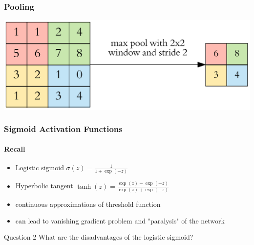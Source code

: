 \documentclass[fullscreen=true, bookmarks=true, hyperref={pdfencoding=unicode}]{beamer}
\begin{document}
\begin{frame}
  \frametitle{Pooling}
  \begin{center}
    \includegraphics[keepaspectratio,
                     width=0.8\paperwidth]{max_pooling.png}
  \end{center}


\end{frame}


\begin{frame}
\frametitle{Sigmoid Activation Functions}
  \framesubtitle{Recall}
   \begin{itemize}
     \item Logistic sigmoid
     $\sigma(z) = \frac{1}{1+\exp(-z)}$

     \pause
     \item Hyperbolic tangent
     $\tanh(z) = \frac{\exp(z)-\exp(-z)}{\exp(z)+\exp(-z)}$

     \pause
     \item continuous approximations of threshold function
     
     \pause
     \item can lead to vanishing gradient problem and "paralysis" of the network
   \end{itemize}

  \pause
  \begin{block}{Question 2}
  What are the disadvantages of the logistic sigmoid?
  \end{block}
\end{frame}
\end{document}
